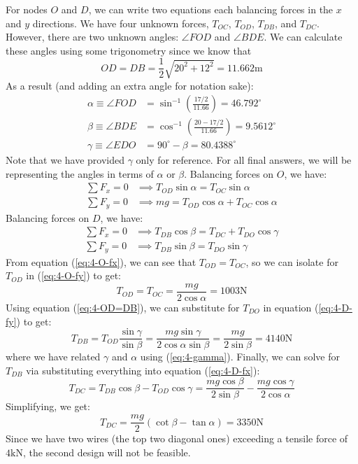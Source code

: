 \documentclass{article}
\begin{document}
For nodes $O$ and $D$, we can write two equations each balancing forces in the $x$ and $y$ directions. We have four unknown forces, $T_{OC}$, $T_{OD}$, $T_{DB}$, and $T_{DC}$. However, there are two unknown angles: $\angle FOD$ and $\angle BDE$. We can calculate these angles using some trigonometry since we know that
\begin{equation}
    OD=DB=\frac{1}{2}\sqrt{20^2+12^2}=11.662 \si{\meter}
    \label{eq:4-OD=DB}
\end{equation}
As a result (and adding an extra angle for notation sake):
\begin{align}
    \alpha \equiv \angle FOD &= \sin^{-1} \left(\frac{17/2}{11.66}\right)=46.792^\circ \\ 
    \beta \equiv \angle BDE &= \cos^{-1} \left(\frac{20-17/2}{11.66}\right)=9.5612^\circ \\ 
    \gamma \equiv \angle EDO &= 90^\circ-\beta=80.4388^\circ \label{eq:4-gamma}
\end{align}
Note that we have provided $\gamma$ only for reference. For all final answers, we will be representing the angles in terms of $\alpha$ or $\beta$. Balancing forces on $O$, we have:
\begin{align}
    \label{eq:4-O-fx} \sum F_x = 0 &\implies T_{OD}\sin\alpha = T_{OC}\sin\alpha \\
    \label{eq:4-O-fy} \sum F_y = 0 &\implies mg = T_{OD}\cos\alpha+T_{OC}\cos\alpha
\end{align}
Balancing forces on $D$, we have:
\begin{align}
     \sum F_x = 0 &\implies T_{DB}\cos\beta = T_{DC}+T_{DO}\cos\gamma \label{eq:4-D-fx}\\
    \label{eq:4-D-fy} \sum F_y = 0 &\implies T_{DB}\sin\beta = T_{DO}\sin\gamma
\end{align}
From equation (\ref{eq:4-O-fx}), we can see that $T_{OD}=T_{OC}$, so we can isolate for $T_{OD}$ in (\ref{eq:4-O-fy}) to get:
\begin{equation}
    \boxed{T_{OD}=T_{OC}=\frac{mg}{2\cos\alpha}=1003\si{\newton}}
    \label{eq:}
\end{equation}
Using equation (\ref{eq:4-OD=DB}), we can substitute for $T_{DO}$ in equation (\ref{eq:4-D-fy}) to get:
\begin{equation}
    \boxed{T_{DB} = T_{OD}\frac{\sin\gamma}{\sin\beta}=\frac{mg\sin\gamma}{2\cos\alpha\sin\beta}=\frac{mg}{2\sin\beta}=4140 \si{\newton}}
    \label{eq:}
\end{equation}
where we have related $\gamma$ and $\alpha$ using (\ref{eq:4-gamma}). Finally, we can solve for $T_{DB}$ via substituting everything into equation (\ref{eq:4-D-fx}):
\begin{equation}
    T_{DC}=T_{DB}\cos\beta-T_{OD}\cos\gamma = \frac{mg\cos\beta}{2\sin\beta}-\frac{mg\cos\gamma}{2\cos\alpha}
    \label{eq:}
\end{equation}
Simplifying, we get:
\begin{equation}
    \boxed{T_{DC}=\frac{mg}{2}\left(\cot\beta-\tan\alpha\right)=3350 \si{\newton}}
    \label{eq:4b-DC}
\end{equation}
Since we have two wires (the top two diagonal ones) exceeding a tensile force of $4\si{\kilo\newton}$, the second design will not be feasible.
\end{document}
